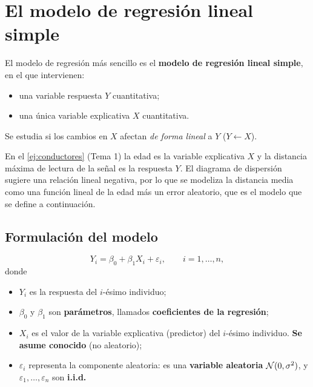 \section{El modelo de regresión lineal simple}
\label{sec:t2-modelo}

El modelo de regresión más sencillo es el \textbf{modelo de regresión lineal simple}, en el
que intervienen:
\begin{itemize}
  \item una variable respuesta $Y$ cuantitativa;
  \item una única variable explicativa $X$ cuantitativa.
\end{itemize}
Se estudia si los cambios en $X$ afectan \emph{de forma lineal} a $Y$ ($Y\leftarrow X$).

\begin{ejemplo}
  En el \cref{ej:conductores} (Tema 1) la edad es la variable explicativa $X$ y la distancia
  máxima de lectura de la señal es la respuesta $Y$. El diagrama de dispersión sugiere una
  relación lineal negativa, por lo que se modeliza la distancia media como una función lineal
  de la edad más un error aleatorio, que es el modelo que se define a continuación.
\end{ejemplo}

\subsection{Formulación del modelo}

\begin{definicion}
  \[
    Y_i = \beta_0 + \beta_1 X_i + \varepsilon_i, \qquad i=1,\ldots,n,
  \]
  donde
  \begin{itemize}
    \item $Y_i$ es la respuesta del $i$-ésimo individuo;
    \item $\beta_0$ y $\beta_1$ son \textbf{parámetros}, llamados \textbf{coeficientes de la
      regresión};
    \item $X_i$ es el valor de la variable explicativa (predictor) del $i$-ésimo individuo.
      \textbf{Se asume conocido} (no aleatorio);
    \item $\varepsilon_i$ representa la componente aleatoria: es una \textbf{variable
      aleatoria} $\mathcal{N}(0,\sigma^2)$, y $\varepsilon_1,\ldots,\varepsilon_n$ son
      \textbf{i.i.d.}
  \end{itemize}
\end{definicion}

